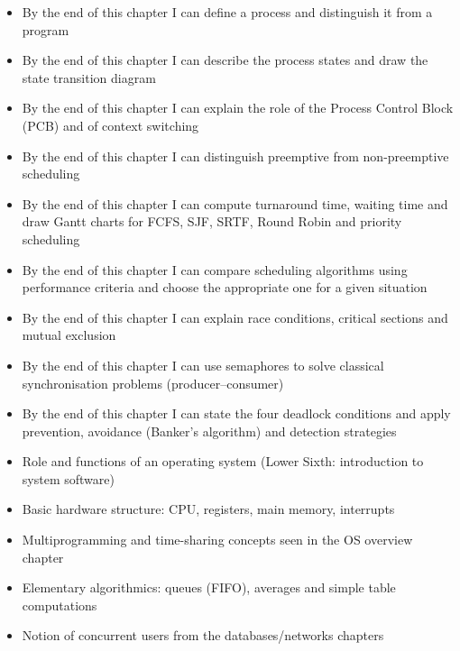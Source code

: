 \documentclass[11pt]{article}
\begin{document}
\begin{objectifs}
\begin{itemize}
\item By the end of this chapter I can define a process and distinguish it from a program
\item By the end of this chapter I can describe the process states and draw the state transition diagram
\item By the end of this chapter I can explain the role of the Process Control Block (PCB) and of context switching
\item By the end of this chapter I can distinguish preemptive from non-preemptive scheduling
\item By the end of this chapter I can compute turnaround time, waiting time and draw Gantt charts for FCFS, SJF, SRTF, Round Robin and priority scheduling
\item By the end of this chapter I can compare scheduling algorithms using performance criteria and choose the appropriate one for a given situation
\item By the end of this chapter I can explain race conditions, critical sections and mutual exclusion
\item By the end of this chapter I can use semaphores to solve classical synchronisation problems (producer–consumer)
\item By the end of this chapter I can state the four deadlock conditions and apply prevention, avoidance (Banker's algorithm) and detection strategies
\end{itemize}
\end{objectifs}

\begin{prerequis}
\begin{itemize}
\item Role and functions of an operating system (Lower Sixth: introduction to system software)
\item Basic hardware structure: CPU, registers, main memory, interrupts
\item Multiprogramming and time-sharing concepts seen in the OS overview chapter
\item Elementary algorithmics: queues (FIFO), averages and simple table computations
\item Notion of concurrent users from the databases/networks chapters
\end{itemize}
\end{prerequis}

\newpage
\end{document}
